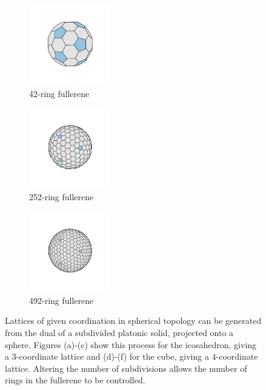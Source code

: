 \begin{figure}[bt]
     \vspace{0.2cm}
     \begin{subfigure}[b]{0.3\textwidth}
         \centering
         \includegraphics[height=3.5cm]{./figures/general_networks/full42.pdf}
         \caption{42\--ring fullerene}
         \label{fig:topo7}
     \end{subfigure}
     \hfill
     \begin{subfigure}[b]{0.3\textwidth}
         \centering
         \includegraphics[height=3.5cm]{./figures/general_networks/full252.pdf}
         \caption{252\--ring fullerene}
         \label{fig:topo8}
     \end{subfigure}
     \hfill
     \begin{subfigure}[b]{0.3\textwidth}
         \centering
         \includegraphics[height=3.5cm]{./figures/general_networks/full492.pdf}
         \caption{492\--ring fullerene}
         \label{fig:topo9}
     \end{subfigure}
     \hfill
     
     \caption{Lattices of given coordination in spherical topology can be generated from the dual of a subdivided platonic solid, projected onto a sphere. Figures (a)\--(c) show this process for the icosahedron, giving a 3\--coordinate lattice and (d)\--(f) for the cube, giving a 4\--coordinate lattice. Altering the number of subdivisions allows the number of rings in the fullerene to be controlled.}
     \label{fig:topomethod}
\end{figure}

